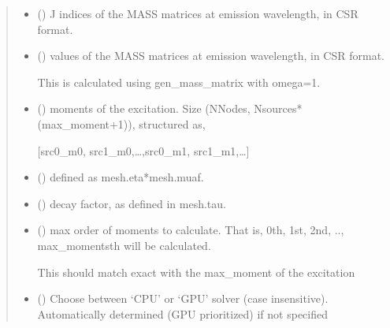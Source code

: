 \documentclass[letterpaper,10pt,english]{sphinxmanual}
\begin{document}
\begin{fulllineitems}
\begin{quote}
\begin{description}
\begin{itemize}
\item {} 
\sphinxAtStartPar
{} (\sphinxstyleliteralemphasis{\sphinxupquote{, }}) \textendash{} J indices of the MASS matrices at emission wavelength, in CSR format.

\item {} 
\sphinxAtStartPar
{} () \textendash{} 
\sphinxAtStartPar
values of the MASS matrices at emission wavelength, in CSR format.

\sphinxAtStartPar
This is calculated using gen\_mass\_matrix with omega=1.


\item {} 
\sphinxAtStartPar
{} () \textendash{} 
\sphinxAtStartPar
moments of the excitation. Size (NNodes, Nsources*(max\_moment+1)), structured as,

\sphinxAtStartPar
{[}src0\_m0, src1\_m0,…,src0\_m1, src1\_m1,…{]}


\item {} 
\sphinxAtStartPar
{} () \textendash{} defined as mesh.eta*mesh.muaf.

\item {} 
\sphinxAtStartPar
{} () \textendash{} decay factor, as defined in mesh.tau.

\item {} 
\sphinxAtStartPar
{} () \textendash{} 
\sphinxAtStartPar
max order of moments to calculate. That is, 0th, 1st, 2nd, .., max\_moments\sphinxhyphen{}th will be calculated.

\sphinxAtStartPar
This should match exact with the max\_moment of the excitation


\item {} 
\sphinxAtStartPar
{} (\sphinxstyleliteralemphasis{\sphinxupquote{, }}) \textendash{} Choose between ‘CPU’ or ‘GPU’ solver (case insensitive). Automatically determined (GPU prioritized) if not specified


\end{itemize}
\end{description}
\end{quote}
\end{fulllineitems}
\end{document}
